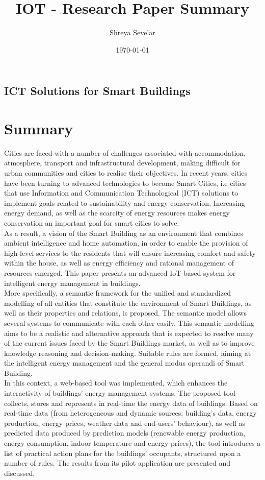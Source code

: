 \documentclass{report}
\title{IOT - Research Paper Summary}
\author{Shreya Sevelar}
\date{\today}
\begin{document}
    
    
    \begin{center}
        \section*{ICT Solutions for Smart Buildings}
    \end{center}
\setlength{\columnsep}{1.0cm}
    \large
    \section*{Summary}
        Cities are faced with a number of challenges associated with accommodation, atmosphere,
    transport and infrastructural development, making difficult for urban communities and cities to
    realise their objectives. In recent years, cities have been turning to advanced technologies to become Smart Cities, i.e cities that use Information and Communication Technological (ICT)
    solutions to implement goals related to sustainability and energy conservation. Increasing energy demand, as well as the scarcity of energy resources makes energy conservation an important goal for smart cities to solve. \\


    As a result, a vision of the Smart Building as an environment that combines ambient intelligence and home automation, in order to enable the provision of high-level services to the residents that will ensure increasing comfort and safety within the house, as well as energy efficiency and rational management of resources emerged. This paper presents an advanced IoT-based system for intelligent energy management in buildings.\\


    More specifically, a semantic framework for the unified and standardized modelling of all entities that constitute the environment of Smart Buildings, as well as their properties and relations, is proposed. The semantic model allows several systems to communicate with each other easily.
    This semantic modelling aims to be a realistic and alternative approach that is expected to resolve many of the current issues faced by the Smart Buildings market, as well as to improve knowledge reasoning and decision-making. Suitable rules are formed, aiming at the intelligent energy management and the general modus operandi of Smart Building.\\ 

    In this context, a web-based tool was implemented, which enhances the interactivity of buildings’ energy management systems. The proposed tool collects, stores and represents in real-time the energy data of buildings. Based on real-time data (from heterogeneous and dynamic sources: building’s data, energy production, energy prices, weather data and end-users’ behaviour), as well as predicted data produced by prediction models (renewable energy production, energy consumption, indoor temperature and energy prices), the tool introduces a list of practical action plans for the buildings’ occupants, structured upon a number of rules. The results from its pilot application are presented and discussed.\\
\end{document}
